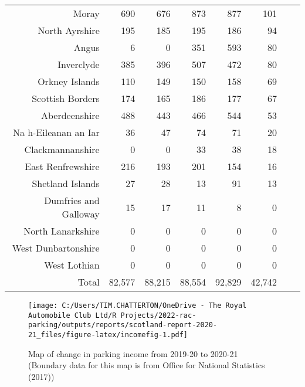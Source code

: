 \documentclass[
  12pt,
]{article}
\begin{document}
\begin{longtable}[t]{rrrrrrrr}
Moray & 690 & 676 & 873 & 877 & 101 & \cellcolor{white}{ -88.5\%} & \cellcolor{white}{ -38.1\%}\\
North Ayrshire & 195 & 185 & 195 & 186 & 94 & \cellcolor{white}{ -49.5\%} & \cellcolor{white}{ -16.7\%}\\
Angus & 6 & 0 & 351 & 593 & 80 & \cellcolor{white}{ -86.5\%} & \cellcolor{white}{  91.1\%}\\
Inverclyde & 385 & 396 & 507 & 472 & 80 & \cellcolor{white}{ -83.1\%} & \cellcolor{white}{ -32.5\%}\\
Orkney Islands & 110 & 149 & 150 & 158 & 69 & \cellcolor{white}{ -56.3\%} & \cellcolor{white}{ -11.0\%}\\
Scottish Borders & 174 & 165 & 186 & 177 & 67 & \cellcolor{white}{ -62.1\%} & \cellcolor{white}{ -21.2\%}\\
Aberdeenshire & 488 & 443 & 466 & 544 & 53 & \cellcolor{white}{ -90.3\%} & \cellcolor{white}{ -42.6\%}\\
Na h-Eileanan an Iar & 36 & 47 & 74 & 71 & 20 & \cellcolor{white}{ -71.8\%} & \cellcolor{white}{ -13.7\%}\\
Clackmannanshire & 0 & 0 & 33 & 38 & 18 & \cellcolor{white}{ -52.6\%} & \cellcolor{white}{}\\
East Renfrewshire & 216 & 193 & 201 & 154 & 16 & \cellcolor{white}{ -89.6\%} & \cellcolor{white}{ -47.8\%}\\
Shetland Islands & 27 & 28 & 13 & 91 & 13 & \cellcolor{white}{ -85.7\%} & \cellcolor{white}{ -16.7\%}\\
Dumfries and Galloway & 15 & 17 & 11 & 8 & 0 & \cellcolor{white}{-100.0\%} & \cellcolor{white}{-100.0\%}\\
North Lanarkshire & 0 & 0 & 0 & 0 & 0 & \cellcolor{white}{   0.0\%} & \cellcolor{white}{   0.0\%}\\
West Dunbartonshire & 0 & 0 & 0 & 0 & 0 & \cellcolor{white}{   0.0\%} & \cellcolor{white}{   0.0\%}\\
West Lothian & 0 & 0 & 0 & 0 & 0 & \cellcolor{white}{   0.0\%} & \cellcolor{white}{   0.0\%}\\
\midrule
Total & 82,577 & 88,215 & 88,554 & 92,829 & 42,742 & \cellcolor{white}{ -54.0\%} & \cellcolor{white}{ -15.2\%}\\*
\end{longtable}
\endgroup{}

\begin{figure}
\centering
\texttt{[image: C:/Users/TIM.CHATTERTON/OneDrive - The Royal Automobile Club Ltd/R Projects/2022-rac-parking/outputs/reports/scotland-report-2020-21\_files/figure-latex/incomefig-1.pdf]}
\caption{\label{fig:incomefig}Map of change in parking income from 2019-20 to 2020-21 (Boundary data for this map is from Office for National Statistics (2017))}
\end{figure}
\end{document}
